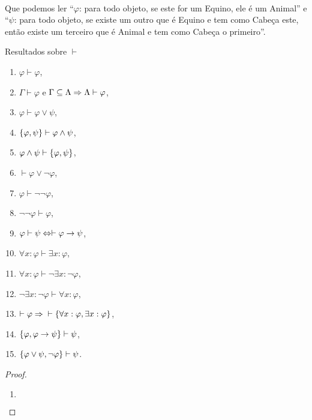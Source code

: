         \paragraph{}
            Que podemos ler ``$\varphi$: para todo objeto, se este for um Equino, 
            ele é um Animal'' e ``$\psi$: para todo objeto, se existe um outro 
            que é Equino e tem como Cabeça este, então existe um terceiro que é 
            Animal e tem como Cabeça o primeiro''.
        \begin{proposition}{Resultados sobre $\vdash$}
            \begin{enumerate}[label=\alph*)]
                \item $    {\varphi}\vdash\varphi$,
                \item $\Gamma\vdash\varphi$ e $\Gamma\subseteq\Lambda\Rightarrow \Lambda\vdash\varphi$,
                \item $    {\varphi}\vdash\varphi\lor\psi$,
                \item $\SET{\varphi}{\psi}\vdash\varphi\land\psi$,
                \item $    {\varphi\land\psi}\vdash\SET{\varphi}{\psi}$,
                \item $    \vdash  \varphi\lor\neg\varphi$,
                \item $\varphi\vdash\neg\neg\varphi$,
                \item $\neg\neg\varphi\vdash\varphi$,
                \item $    {\varphi}\vdash\psi\Leftrightarrow\vdash\varphi\rightarrow\psi$,
                \item $    {\forall x:\varphi}\vdash\exists x:\varphi$,
                \item $    {\forall x:\varphi}\vdash\neg\exists x:\neg\varphi$,
                \item $    {\neg\exists x:\neg\varphi}\vdash\forall x:\varphi$,
                \item $\vdash\varphi\RAR{}\vdash\SET{\forall x:\varphi}{\exists x:\varphi}$,
                \item $\SET{\varphi}{\varphi\rar\psi}\vdash\psi$,
                \item $\SET{\varphi\lor\psi}{\neg\varphi}\vdash\psi$.
            \end{enumerate}
            \begin{proof}
                \begin{enumerate}[label=\alph*)]
                    \item $ $

\end{enumerate}
\end{proof}
\end{proposition}
